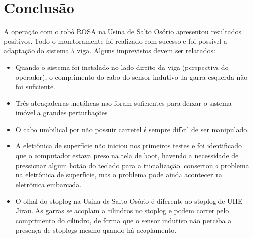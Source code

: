 \section{Conclusão}

A operação com o robô ROSA na Usina de Salto Osório apresentou resultados
positivos. Todo o monitoramente foi realizado com sucesso e foi possível a
adaptação do sistema à viga. Alguns imprevistos devem ser relatados:

\begin{itemize}
  \item Quando o sistema foi instalado no lado direito da viga (perspectiva do
  operador), o comprimento do cabo do sensor indutivo da garra esquerda não foi
  suficiente.
  \item Três abraçadeiras metálicas não foram suficientes para deixar o sistema
  imóvel a grandes perturbações.
  \item O cabo umbilical por não possuir carretel é sempre difícil de ser
  manipulado.
  \item A eletrônica de superfície não iniciou nos primeiros testes e foi
  identificado que o computador estava preso na tela de boot, havendo a
  necessidade de pressionar algum botão do teclado para a inicialização.
  \sylvain consertou o problema na eletrônica de superfície, mas o problema pode
  ainda acontecer na eletrônica embarcada.
  \item O olhal do stoplog na Usina de Salto Osório é diferente ao stoplog de
  UHE Jirau. As garras se acoplam a cilindros no stoplog e podem correr pelo
  comprimento do cilindro, de forma que o sensor indutivo não perceba a presença
  de stoplogs mesmo quando há acoplamento.
\end{itemize}
